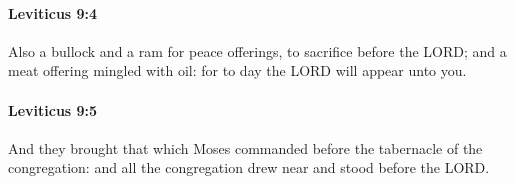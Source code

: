 		\paragraph{Leviticus 9:4} %
			\label{LEVITICUS-9-4}

			Also a bullock and a ram for peace offerings, to sacrifice before the LORD; and a meat offering mingled with oil: for to day the LORD will appear unto you.


		\paragraph{Leviticus 9:5} %
			\label{LEVITICUS-9-5}

			And they brought that which Moses commanded before the tabernacle of the congregation: and all the congregation drew near and stood before the LORD.


